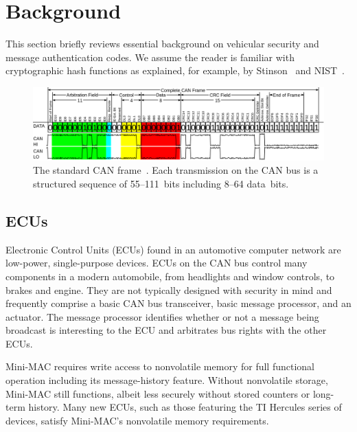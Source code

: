 \section{Background}
\label{background}

This section briefly reviews essential background on vehicular security and message authentication codes. 
We assume the reader is familiar with cryptographic hash functions as explained, for example, 
by Stinson~\cite{Stinson} and NIST~\cite{FIPS-180-4}.


	\begin{figure}
		\centering
		\includegraphics[width=\linewidth]{figures/can_frame.png}
		\caption{The standard CAN frame~\cite{fig1}.  
		Each transmission on the CAN bus is a structured sequence of 55--111~bits including 8--64 data~bits.}
		\label{fig-frame}
	\end{figure}

\subsection{ECUs}
\label{ecu}

Electronic Control Units (ECUs) found in an automotive computer network are low-power, single-purpose devices. ECUs on the CAN bus control many components in a modern automobile, from headlights and window controls, to brakes and engine. They are not typically designed with security in mind and frequently comprise a basic CAN bus transceiver, basic message processor, and an actuator. The message processor identifies whether or not a message being broadcast is interesting to the ECU and arbitrates bus rights with the other ECUs. 

Mini-MAC requires write access to nonvolatile memory for full functional operation including its message-history feature.
Without nonvolatile storage, Mini-MAC still functions, albeit less securely without stored counters or long-term history. 
Many new ECUs, such as those featuring the TI Hercules series of devices, satisfy Mini-MAC's nonvolatile memory requirements.

